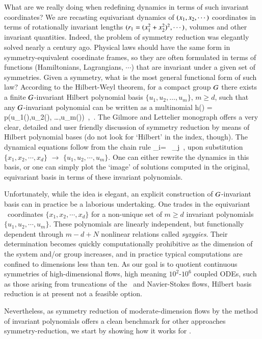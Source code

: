 What are we really doing when redefining dynamics in terms of
such invariant coordinates? We are recasting equivariant
dynamics of $(x_1,x_2,\cdots)$ coordinates in terms of
rotationally invariant lengths
$(r_1=(x_1^2+x_2^2)^2,\cdots)$, volumes and other
invariant quantities. Indeed, the problem of symmetry
reduction {was} elegantly solved nearly a century ago.
Physical laws should have the same form in
symmetry-equivalent coordinate frames, so they are often
formulated in terms of functions (Hamiltonians, Lagrangians,
$\cdots$) {that are} invariant under a given set of symmetries. Given a
symmetry, what is the most general functional form of such
law? According to the Hilbert-Weyl theorem, for a compact
group $G$ there exists a finite $G${-invariant}
Hilbert polynomial basis $\{u_1,u_2, \dots,u_m\}$, $ m \geq
d$, such that any $G${-invariant} polynomial can be
written as a multinomial
\beq
h(\ssp) = p(u_1(\ssp),u_2(\ssp), \dots,u_m(\ssp))
    \,,\qquad \ssp \in \pS
\,.
{The} Gilmore and Lettelier monograph offers
a very clear, detailed and user friendly discussion of
symmetry reduction by means of Hilbert polynomial bases (do
not look for `Hilbert' in the index, though).
The dynamical equations follow from the chain rule
\beq
 _i= \, _j
 \,,
upon substitution $\{x_1,x_2,\cdots,x_d\}$ $\to$
$\{u_1,u_2,\cdots,u_m\}$. One can either rewrite the dynamics
in this basis, or one can simply plot the `image' of
solutions computed in the original, equivariant basis in
terms of these invariant polynomials.

Unfortunately, while the idea is elegant, an explicit
construction of $G${-invariant} basis can in practice be
a laborious undertaking. One trades in the equivariant
\statesp\ coordinates $\{x_1,x_2,\cdots,x_d\}$ for a
non-unique set  of $m \geq d$ invariant polynomials
$\{u_1,u_2,\cdots,u_m\}$. These polynomials are linearly
independent, but functionally dependent through $m - d + N$
nonlinear relations called \emph{syzygies}. Their
determination becomes quickly computationally prohibitive as
the dimension of the system and/or group
increases, and in practice
typical computations are confined to dimensions less than
ten. As our goal is to quotient continuous symmetries of
high-dimensional flows, high meaning $10^2$-$10^6$ coupled
ODEs, such as those arising from truncations of the \KS\ and
Navier-Stokes flows, {Hilbert basis reduction} is
at present not a feasible option.

Nevertheless, as symmetry reduction of moderate-dimension
flows by the method of invariant polynomials offers a clean
benchmark for other approaches symmetry-reduction, we start
by showing how it works for \cLf.

